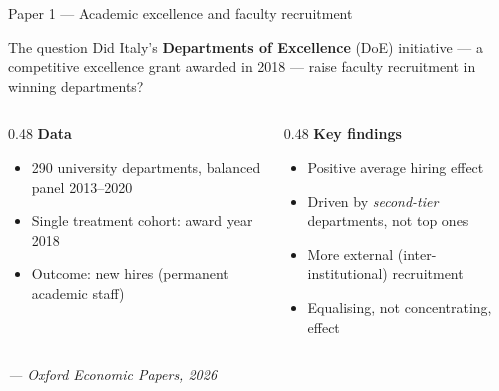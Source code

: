 \documentclass[aspectratio=169, 10pt]{beamer}
\begin{document}
\begin{frame}{Paper 1 — Academic excellence and faculty recruitment}

  \begin{block}{The question}
    Did Italy's \textbf{Departments of Excellence} (DoE) initiative --- a
    competitive excellence grant awarded in 2018 --- raise faculty recruitment
    in winning departments?
  \end{block}

  \medskip
  \begin{columns}[T]
    \begin{column}{0.48\textwidth}
      \textbf{Data}
      \begin{itemize}
        \item 290 university departments, balanced panel 2013--2020
        \item Single treatment cohort: award year 2018
        \item Outcome: new hires (permanent academic staff)
      \end{itemize}
    \end{column}
    \begin{column}{0.48\textwidth}
      \textbf{Key findings}
      \begin{itemize}
        \item Positive average hiring effect
        \item Driven by \emph{second-tier} departments, not top ones
        \item More external (inter-institutional) recruitment
        \item Equalising, not concentrating, effect
      \end{itemize}
    \end{column}
  \end{columns}

  \medskip
  \small\textit{\citet{rizzo2025doe} — Oxford Economic Papers, 2026}

\end{frame}
\end{document}

